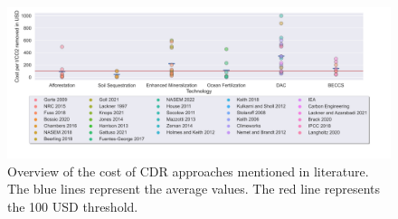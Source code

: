 \begin{figure}
\captionsetup{margin=3.5cm}
    \centering
    \includegraphics[width=600pt]{figures/cost.png}
    \caption[Overview of the cost of CDR approaches mentioned in literature]{Overview of the cost of CDR approaches mentioned in literature. The blue lines represent the average values. The red line represents the 100 USD threshold.}
    \label{fig:awesome_image}
\end{figure}

\nocite{House2011EconomicAir, Aumont2006GlobalizingStudies, Buesseler2008OceanUncertainty, Cao2010ImportanceChange, Oschlies2010ClimateApprentice, Beringer2011BioenergyConstraints, Rogner2012EnergyPotentials, Krey2014GlobalReview, Cornelissen2012TheSystem}
\nocite{Cornelissen2012TheSystem, Mazzotti2013DirectContactor, Socolow2011DirectAffairs, Zeman2014ReducingCO2, Nemet2011WillingnessCapture, Kulkarni2012AnalysisAir, Stolaroff2008CarbonSpray}
\nocite{McKinsey2020ClimateTake, Liu2023Monitoring2022}